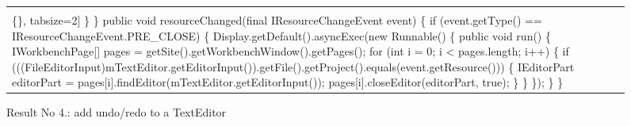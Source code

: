 \begin{figure*}[!htb]
\begin{minipage}{1\textwidth}
\begin{tabular}{@{}p{}}
\begin{Verbatim}[commandchars=\\\{\}, tabsize=2]
  \} \}
 public void resourceChanged(final IResourceChangeEvent event) \{
  if (event.getType() == IResourceChangeEvent.PRE_CLOSE) \{
   Display.getDefault().asyncExec(new Runnable() \{
   public void run() \{
    IWorkbenchPage[] pages = getSite().getWorkbenchWindow().getPages();
    for (int i = 0; i < pages.length; i++) \{
     if (((FileEditorInput)mTextEditor.getEditorInput()).getFile().getProject().equals(event.getResource())) \{
      IEditorPart editorPart = pages[i].findEditor(mTextEditor.getEditorInput());
      pages[i].closeEditor(editorPart, true);
    \}  \} \}); \} \}
  \end{Verbatim}
      \vspace{-4mm}
     \\ \hline
\end{tabular} 
\caption{Result No 4.: add undo/redo to a TextEditor}
\label{fig:undoEditor}
\end{minipage}
\end{figure*}










